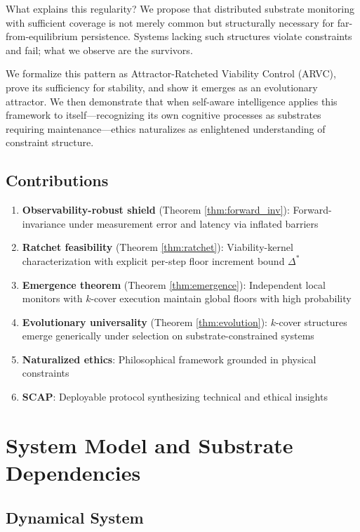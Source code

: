 \documentclass[11pt,a4paper]{article}
\theoremstyle{definition}
\begin{document}
What explains this regularity? We propose that distributed substrate monitoring with sufficient coverage is not merely common but structurally necessary for far-from-equilibrium persistence. Systems lacking such structures violate constraints and fail; what we observe are the survivors.

We formalize this pattern as Attractor-Ratcheted Viability Control (ARVC), prove its sufficiency for stability, and show it emerges as an evolutionary attractor. We then demonstrate that when self-aware intelligence applies this framework to itself---recognizing its own cognitive processes as substrates requiring maintenance---ethics naturalizes as enlightened understanding of constraint structure.

\subsection{Contributions}

\begin{enumerate}
\item \textbf{Observability-robust shield} (Theorem \ref{thm:forward_inv}): Forward-invariance under measurement error and latency via inflated barriers
\item \textbf{Ratchet feasibility} (Theorem \ref{thm:ratchet}): Viability-kernel characterization with explicit per-step floor increment bound $\Delta^*$
\item \textbf{Emergence theorem} (Theorem \ref{thm:emergence}): Independent local monitors with $k$-cover execution maintain global floors with high probability
\item \textbf{Evolutionary universality} (Theorem \ref{thm:evolution}): $k$-cover structures emerge generically under selection on substrate-constrained systems
\item \textbf{Naturalized ethics}: Philosophical framework grounded in physical constraints
\item \textbf{SCAP}: Deployable protocol synthesizing technical and ethical insights
\end{enumerate}

\section{System Model and Substrate Dependencies}

\subsection{Dynamical System}
\end{document}
